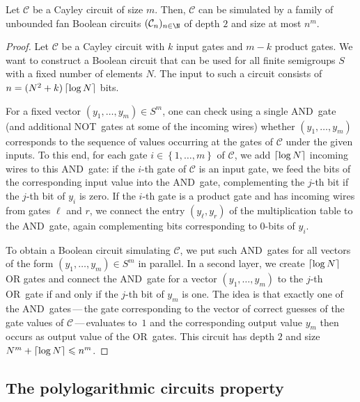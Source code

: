 \documentclass{toc}
\renewcommand{\leq}{\leqslant}
\renewcommand{\le}{\leq}
\newcommand{\ceil}[1]{\ensuremath\left\lceil#1\right\rceil}
\newcommand{\os}[1]{\ensuremath{\left\{#1\right\}}}
\renewcommand{\C}{\ensuremath{\mathcal{C}}}
\newcommand{\SPLCP}{polylogarithmic circuits property}
\begin{document}
\begin{proposition}
  Let $\C$ be a Cayley circuit of size $m$.
  Then, $\C$ can be simulated by a family of unbounded fan Boolean circuits
  $(\C_n)_{n \in \N}$ of depth $2$ and size at most $n^m$.
  \label{prop:simulation}
\end{proposition}

\begin{proof}
  Let $\C$ be a Cayley circuit with $k$ input gates and $m-k$ product gates.
  We want to construct a Boolean circuit that can be used for all finite
  semigroups $S$ with a fixed number of elements $N$.
  The input to such a circuit consists of $n = (N^2 + k) \ceil{\log N}$ bits.

  For a fixed vector $(y_1, \dots, y_m) \in S^m$, one can check using a single
  AND~gate (and additional NOT~gates at some of the incoming wires) whether
  $(y_1, \dots, y_m)$ corresponds to the sequence of values occurring at the
  gates of $\C$ under the given inputs.
  To this end, for each gate $i \in \os{1, \dots, m}$ of $\C$, we add
  $\ceil{\log N}$ incoming wires to this AND~gate:
  if the $i$-th gate of $\C$ is an input gate, we feed the bits of the
  corresponding input value into the AND~gate, complementing the $j$-th bit if
  the $j$-th bit of $y_i$ is zero.
  If the $i$-th gate is a product gate and has incoming wires from gates $\ell$
  and $r$, we connect the entry $(y_\ell, y_r)$ of the multiplication table to
  the AND~gate, again complementing bits corresponding to 0-bits of $y_i$.

  To obtain a Boolean circuit simulating $\C$, we put such AND~gates for all
  vectors of the form $(y_1, \dots, y_m) \in S^m$ in parallel. In a second
  layer, we create $\ceil{\log N}$ OR gates and connect the AND~gate for a
  vector $(y_1, \dots, y_m)$ to the $j$-th OR~gate if and only if the $j$-th
  bit of $y_m$ is one.
  The idea is that exactly one of the AND~gates\,---\,the gate corresponding to
  the vector of correct guesses of the gate values of $\C$\,---\,evaluates
  to~$1$ and the corresponding output value $y_m$ then occurs as output value
  of the OR~gates.
  This circuit has depth $2$ and size $N^m + \ceil{\log N} \le n^m$.
\end{proof}

%
\subsection{The {\SPLCP}}    %
\end{document}
